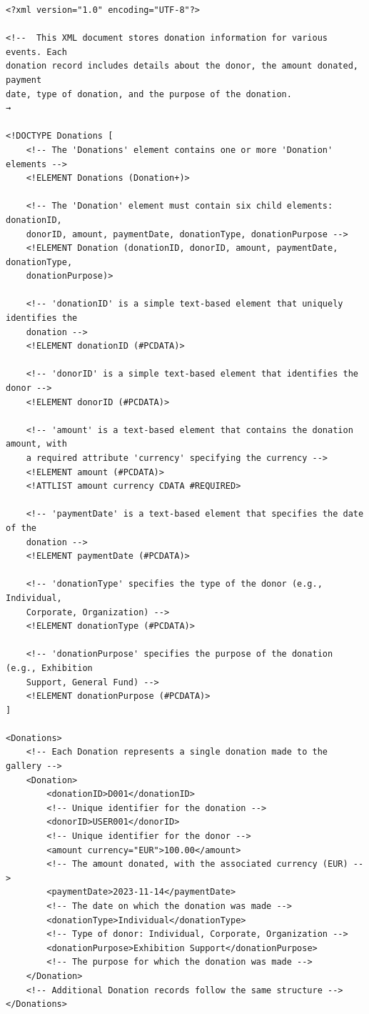 \documentclass{article} %
\begin{document}
\begin{verbatim}
<?xml version="1.0" encoding="UTF-8"?>

<!--  This XML document stores donation information for various events. Each 
donation record includes details about the donor, the amount donated, payment 
date, type of donation, and the purpose of the donation.
→

<!DOCTYPE Donations [
    <!-- The 'Donations' element contains one or more 'Donation' elements -->
    <!ELEMENT Donations (Donation+)>

    <!-- The 'Donation' element must contain six child elements: donationID, 
    donorID, amount, paymentDate, donationType, donationPurpose -->
    <!ELEMENT Donation (donationID, donorID, amount, paymentDate, donationType, 
    donationPurpose)>

    <!-- 'donationID' is a simple text-based element that uniquely identifies the 
    donation -->
    <!ELEMENT donationID (#PCDATA)>

    <!-- 'donorID' is a simple text-based element that identifies the donor -->
    <!ELEMENT donorID (#PCDATA)>

    <!-- 'amount' is a text-based element that contains the donation amount, with 
    a required attribute 'currency' specifying the currency -->
    <!ELEMENT amount (#PCDATA)>
    <!ATTLIST amount currency CDATA #REQUIRED>

    <!-- 'paymentDate' is a text-based element that specifies the date of the 
    donation -->
    <!ELEMENT paymentDate (#PCDATA)>

    <!-- 'donationType' specifies the type of the donor (e.g., Individual, 
    Corporate, Organization) -->
    <!ELEMENT donationType (#PCDATA)>

    <!-- 'donationPurpose' specifies the purpose of the donation (e.g., Exhibition 
    Support, General Fund) -->
    <!ELEMENT donationPurpose (#PCDATA)>
]

<Donations>
    <!-- Each Donation represents a single donation made to the gallery -->
    <Donation>
        <donationID>D001</donationID>
        <!-- Unique identifier for the donation -->
        <donorID>USER001</donorID>
        <!-- Unique identifier for the donor -->
        <amount currency="EUR">100.00</amount>
        <!-- The amount donated, with the associated currency (EUR) -->
        <paymentDate>2023-11-14</paymentDate>
        <!-- The date on which the donation was made -->
        <donationType>Individual</donationType>
        <!-- Type of donor: Individual, Corporate, Organization -->
        <donationPurpose>Exhibition Support</donationPurpose>
        <!-- The purpose for which the donation was made -->
    </Donation>
    <!-- Additional Donation records follow the same structure -->
</Donations>
    
\end{verbatim}
\end{document}
